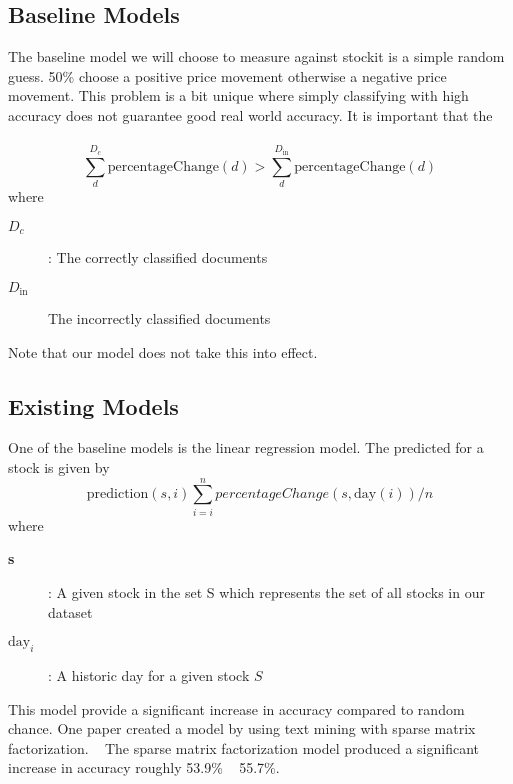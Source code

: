 \documentclass[11pt,letterpaper]{article}
\newcommand{\blue}[1]{\textcolor{RoyalBlue}{#1}}
\newcommand{\instructions}[1]{\blue{\textit{#1}}}
\begin{document}
\subsection{Baseline Models}
\label{sec:baseline-models}
The baseline model we will choose to measure against stockit is a simple random guess.
50\% choose a positive price movement otherwise a negative price movement. This problem is a bit unique
where simply classifying with high accuracy does not guarantee good real world accuracy. It is important that the \\ \\
\begin{equation}\label{acc:constraint}
	\sum_{d}^{D_c} \text{percentageChange}(d) > \sum_{d}^{D_{\text{in}}} \text{percentageChange}(d)
\end{equation}
where
\begin{description}
	\item[\textbf{\(D_c\)}] : The correctly classified documents
	\item[\textbf{\(D_{\text{in}}\)}] The incorrectly classified documents
\end{description}
Note that our model does not take this into effect.

\subsection{Existing Models}
\label{sec:existing-models}
One of the baseline models is the linear regression model. The predicted for a stock is given by
\begin{equation}\label{pred:uniform}
	\text{prediction}(s, i) \sum_{i=i}^{n} percentageChange(s, \text{day}(i)) / n
\end{equation}
where
\begin{description}
	\item[\textbf{s}] : A given stock in the set S which represents the set of all stocks in our dataset
	\item[\textbf{\(\text{day}_i\)}] : A historic day for a given stock \(S\) 
\end{description}
This model provide a significant increase in accuracy compared to random chance.
One paper created a model by using text mining with sparse matrix factorization. ~\cite{stock-matrix}
The sparse matrix factorization model produced a significant increase in accuracy roughly 53.9\% ~ 55.7\%.
\end{document}
